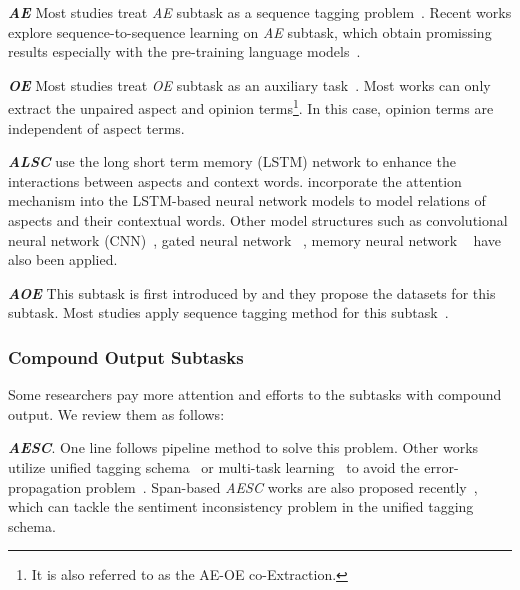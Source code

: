 \documentclass[11pt,a4paper]{article}
\begin{document}
\textbf{\emph{AE}} Most studies treat \emph{AE} subtask as a  sequence tagging problem~\citep{DBLP:conf/emnlp/LiL17,DBLP:conf/acl/XuLSY18,DBLP:conf/ijcai/LiBLLY18}. Recent works explore sequence-to-sequence learning on \emph{AE} subtask, which obtain promissing results  especially with the pre-training language models~\citep{dblp:conf/acl/malwxw19, DBLP:conf/acl/LiCQLS20}.

\textbf{\emph{OE}} Most studies treat \emph{OE} subtask  as an auxiliary task~\citep{DBLP:conf/emnlp/WangPDX16,DBLP:conf/aaai/WangPDX17, DBLP:conf/acl/PanW18, DBLP:conf/acl/ChenQ20,DBLP:conf/acl/HeLND19}. Most works can only extract the unpaired aspect and opinion terms\footnote{It is also referred to as the AE-OE co-Extraction.}. In this case, opinion terms are independent of aspect terms.

\textbf{\emph{ALSC}} \citet{DBLP:conf/coling/TangQFL16} use the long short term memory (LSTM) network to enhance the interactions between aspects and context words. \citet{DBLP:conf/emnlp/WangHZZ16,DBLP:conf/eacl/ZhangL17,DBLP:conf/ijcai/MaLZW17,DBLP:conf/aaai/TayTH18a} incorporate the attention mechanism into the LSTM-based neural network models to model relations of aspects and their contextual words. Other model structures such as convolutional neural network (CNN)~\citep{DBLP:conf/acl/LamLSB18,DBLP:conf/acl/LiX18}, gated neural network ~\citep{DBLP:conf/aaai/ZhangZV16,DBLP:conf/acl/LiX18}, memory neural network ~\citep{DBLP:conf/emnlp/TangQL16,DBLP:conf/emnlp/ChenSBY17} have also been applied.



\textbf{\emph{AOE}} This subtask is first introduced by \citet{DBLP:conf/naacl/FanWDHC19}  and they propose the datasets for this subtask. Most studies apply sequence tagging method for this subtask~\citep{DBLP:conf/aaai/WuZDHC20,DBLP:conf/emnlp/VeysehNDDN20}.
\subsubsection{Compound Output Subtasks}
Some researchers pay more attention and efforts to the subtasks with compound output. We review them as follows:


\textbf{\emph{AESC}}. One line follows pipeline method to solve this problem. Other works utilize unified tagging schema~\citep{DBLP:conf/emnlp/MitchellAWD13,DBLP:conf/emnlp/ZhangZV15,DBLP:conf/aaai/LiBLL19} or multi-task learning~\citep{DBLP:conf/acl/HeLND19,DBLP:conf/acl/ChenQ20} to avoid the error-propagation problem~\citep{DBLP:conf/emnlp/MaLW18}. Span-based \emph{AESC}  works are also proposed recently~\citep{DBLP:conf/acl/HuPHLL19}, which can tackle the sentiment inconsistency problem in the unified tagging schema.
\end{document}
